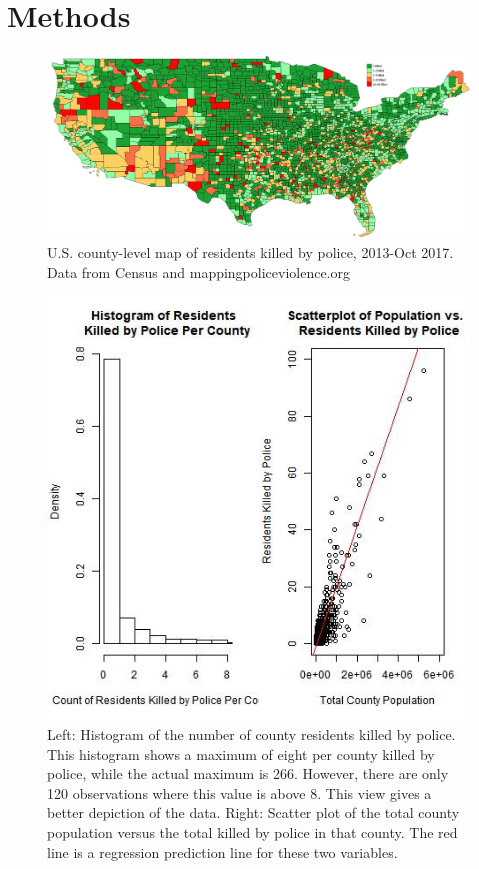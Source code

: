 \documentclass[sigconf]{acmart}
\begin{document}
\section{Methods}



\begin{figure}
\includegraphics[width=1.0\textwidth]{images/figure1.jpg}
\caption{U.S. county-level map of residents killed by police, 2013-Oct 2017.  Data from Census and mappingpoliceviolence.org}
\end{figure}



\begin{figure}
\includegraphics[width=1.0\textwidth]{images/figure4.jpg}
\caption{Left: Histogram of the number of county residents killed by police.  This histogram shows a maximum of eight per county killed by police, while the actual maximum is 266.  However, there are only 120 observations where this value is above 8.  This view gives a better depiction of the data.  Right: Scatter plot of the total county population versus the total killed by police in that county.  The red line is a regression prediction line for these two variables.}
\end{figure}
\end{document}
